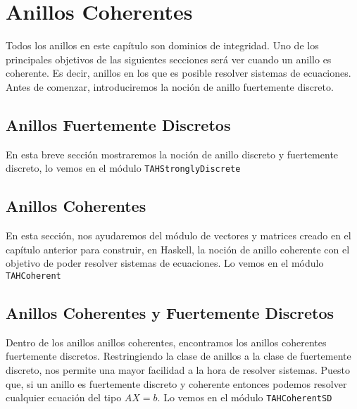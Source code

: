 \chapter{Anillos Coherentes}\label{sec:coherentHas}
Todos los anillos en este capítulo son dominios de integridad. Uno de los principales objetivos de las siguientes secciones será ver cuando un anillo es coherente. Es decir, anillos en los que es posible resolver sistemas de ecuaciones. Antes de comenzar, introduciremos la noción de anillo fuertemente discreto.
\section{Anillos Fuertemente Discretos}
En esta breve sección mostraremos la noción de anillo discreto y fuertemente discreto, lo vemos en el módulo \texttt{TAHStronglyDiscrete} 

\section{Anillos Coherentes}
En esta sección, nos ayudaremos del módulo de vectores y matrices creado en el capítulo anterior para construir, en Haskell, la noción de anillo coherente con el objetivo de poder resolver sistemas de ecuaciones. Lo vemos en el módulo \texttt{TAHCoherent} 

\section{Anillos Coherentes y Fuertemente Discretos }
Dentro de los anillos anillos coherentes, encontramos los anillos coherentes fuertemente discretos. Restringiendo la clase de anillos a la clase de fuertemente discreto, nos permite una mayor facilidad a la hora de resolver sistemas. Puesto que, si un anillo es fuertemente discreto y coherente entonces podemos resolver cualquier ecuación del tipo $AX=b$. Lo vemos en el módulo \texttt{TAHCoherentSD} 


